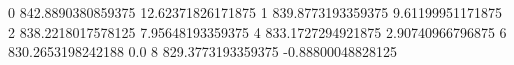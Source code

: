 0 842.8890380859375 12.62371826171875
1 839.8773193359375 9.61199951171875
2 838.2218017578125 7.95648193359375
4 833.1727294921875 2.90740966796875
6 830.2653198242188 0.0
8 829.3773193359375 -0.88800048828125
